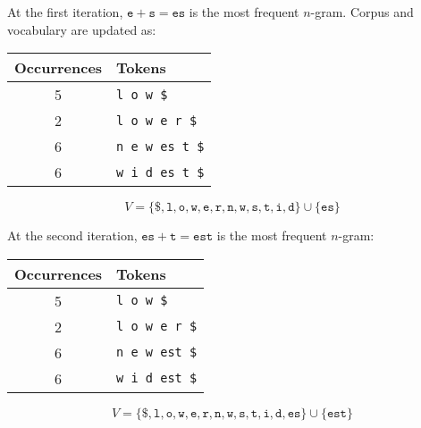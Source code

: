 \begin{description}
\begin{description}
\begin{example}
                    At the first iteration, $\texttt{e} + \texttt{s} = \texttt{es}$ is the most frequent $n$-gram. Corpus and vocabulary are updated as:
                    \begin{table}[H]
                        \centering
                        \footnotesize
                        \begin{tabular}{cl}
                            \toprule
                            \textbf{Occurrences} & \textbf{Tokens} \\
                            \midrule
                            5 & \texttt{l o w \$} \\
                            2 & \texttt{l o w e r \$} \\
                            6 & \texttt{n e w es t \$} \\
                            6 & \texttt{w i d es t \$} \\
                            \bottomrule
                        \end{tabular}
                    \end{table}
                    \vspace{-2em}
                    \[ V = \{  \texttt{\$}, \texttt{l}, \texttt{o}, \texttt{w}, \texttt{e}, \texttt{r}, \texttt{n}, \texttt{w}, \texttt{s}, \texttt{t}, \texttt{i}, \texttt{d} \} \cup \{ \texttt{es} \} \]

                    At the second iteration, $\texttt{es} + \texttt{t} = \texttt{est}$ is the most frequent $n$-gram:
                    \begin{table}[H]
                        \centering
                        \footnotesize
                        \begin{tabular}{cl}
                            \toprule
                            \textbf{Occurrences} & \textbf{Tokens} \\
                            \midrule
                            5 & \texttt{l o w \$} \\
                            2 & \texttt{l o w e r \$} \\
                            6 & \texttt{n e w est \$} \\
                            6 & \texttt{w i d est \$} \\
                            \bottomrule
                        \end{tabular}
                    \end{table}
                    \vspace{-2em}
                    \[ V = \{  \texttt{\$}, \texttt{l}, \texttt{o}, \texttt{w}, \texttt{e}, \texttt{r}, \texttt{n}, \texttt{w}, \texttt{s}, \texttt{t}, \texttt{i}, \texttt{d}, \texttt{es} \} \cup \{ \texttt{est} \} \]


\end{example}
\end{description}
\end{description}

